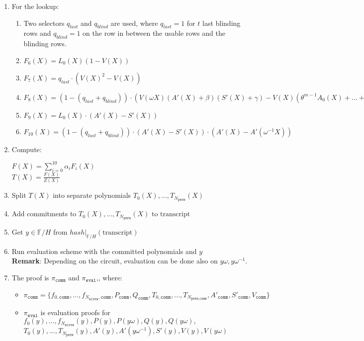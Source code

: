 \begin{enumerate}
\begin{center}
	\end{center}
	\item For the lookup:
	\begin{enumerate}
		\item Two selectors $q_{last}$ and $q_{blind}$ are used, where $q_{last} = 1$ for $t$ last blinding rows and $q_{blind} = 1$ on the row in between the usable rows and the blinding rows.
		\item $F_6(X) = L_0(X) (1 - V(X))$
		\item $F_7(X) = q_{last} \cdot (V(X)^2 - V(X))$
		\item $F_8(X) = (1 - (q_{last} + q_{blind})) \cdot ( V(\omega X) (A'(X) + \beta) (S'(X) + \gamma) - V(X) (\theta^{m-1} A_0(X) + ... + A_{m-1}(X) + \beta) (\theta^{m-1} S_0(X) + ... + S_{m-1}(X) + \gamma) )$
		\item $F_9(X) = L_0(X) \cdot (A'(X) - S'(X))$
		\item $F_{10}(X) = (1 - (q_{last} + q_{blind})) \cdot (A'(X) - S'(X))\cdot(A'(X) - A'(\omega^{-1} X))$
	\end{enumerate}
	\item Compute:
	\begin{center}
		$F(X) = \sum\limits_{i = 0}^{10} \alpha_iF_i(X)$ \\
		$T(X) = \frac{F(X)}{Z(X)}$
	\end{center}
	\item Split $T(X)$ into separate polynomials $T_0(X), ..., T_{N_{\texttt{perm}}}(X)$
	\item Add commitments to $T_0(X), ..., T_{N_{\texttt{perm}}}(X)$ to $\text{transcript}$
	\item Get $y \in \mathbb{F}/H$ from $hash|_{\mathbb{F}/H}(\text{transcript})$
	\item Run evaluation scheme with the committed polynomials and $y$ \\
	\textbf{Remark}: Depending on the circuit, evaluation can be done also on $y\omega, y\omega^{-1}$.
	\item The proof is $\pi_{\texttt{comm}}$ and $\pi_{\texttt{eval}}$,, where:
		\begin{itemize}
			\item $\pi_{\texttt{comm}} = \{f_{0, \texttt{comm}}, \dots, f_{N_{\texttt{wires}}, \texttt{comm}},
			 P_{\texttt{comm}}, Q_{\texttt{comm}}, T_{0, \texttt{comm}}, ..., T_{N_{\texttt{perm}, \texttt{comm}}},
			 A'_{\texttt{comm}}, S'_{\texttt{comm}}, V_{\texttt{comm}} \}$
			 \item  $\pi_{\texttt{eval}}$ is evaluation proofs for $f_0(y), \dots, f_{N_{\texttt{wires}}}(y),
			 P(y), P(y\omega), Q(y), Q(y\omega),$ \\
			 $T_0(y), \dots, T_{N_{\texttt{perm}}}(y), A'(y), A'(y\omega^{-1}), S'(y), V(y), V(y\omega)$
		\end{itemize}
\end{enumerate}

